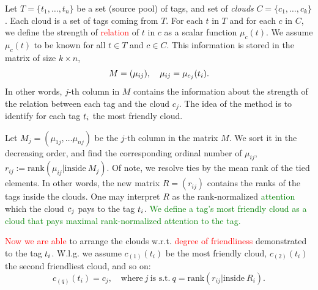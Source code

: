 \documentclass{llncs}
\begin{document}
Let $T = \{t_1, \dots, t_n\}$ be a set (source pool) of tags, and set of \textit{clouds} $C = \{c_1, \dots, c_k\}$. Each cloud is a set of tags coming from $T$. %
For each $t$ in $T$ and for each $c$ in $C$, we define the strength of \textcolor{red}{relation} of $t$ in $c$ as a scalar function $\mu_c(t)$. 
We assume $\mu_c(t)$ to be known for all $t\in T$ and $c \in C$. This information is stored in the matrix of size $k\times n$, 
\[
M = (\mu_{ij}), 
\quad \mu_{ij} = \mu_{c_j}(t_i).
\]
In other words, $j$-th column in $M$ contains the information about the strength of the relation between each tag and the cloud $c_j$.
The idea of the method is 
to identify for each tag $t_i$ the most friendly cloud.

Let $M_j =(\mu_{1j}, \dots \mu_{nj})$ be the $j$-th column in the matrix $M$. 
We sort it in the decreasing order, and find the corresponding ordinal number of $\mu_{ij}$,
$r_{ij} := \text{rank}(\mu_{ij}|\text{inside}~M_j)$.
Of note, we resolve ties by the mean rank of the tied elements.
In other words, the new matrix
$R = (r_{ij})$ contains the ranks of the tags inside the clouds.
One may interpret $R$ as the rank-normalized \textcolor{green}{attention} which the cloud $c_j$ pays to the tag $t_i$. \textcolor{green}{We define a tag's most friendly cloud as a cloud that pays maximal rank-normalized attention to the tag.} 

\textcolor{red}{Now we are able} to arrange the clouds w.r.t. \textcolor{red}{degree of friendliness} demonstrated to the tag $t_i$. W.l.g. we assume 
$c_{(1)}(t_i)$ be the most friendly cloud, $c_{(2)}(t_i)$ the second friendliest cloud, and so on:
\[
c_{(q)}(t_i) = c_{j}, \quad \text{where}~j~\text{is s.t.}~ q = \text{rank}(r_{ij}|\text{inside}~R_i).
\]
\end{document}
